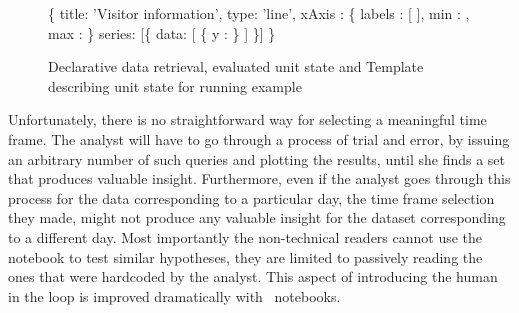 \begin{figure}[hbt!]
\begin{minipage}[c]{6cm}
 \begin{minipage}[c]{7.5cm}
 \begin{code}
    \{
     title: 'Visitor information',
     type: 'line',
     xAxis : \{ 
       labels : [
         ],
       min : ,
       max : 
     \}
     series: [\{
       data: [ 
           \{
             y  : 
           \}  
            ]
     \}] \} 
 \end{code}
 \vspace*{-0.2cm}
 \vspace*{0cm}
 \label{figure:first-running-example:main-template}
 \end{minipage}
 \end{minipage}
 \vspace*{-0.3cm}
 \caption{Declarative data retrieval, evaluated unit state and Template describing unit state for running example}
 \vspace*{-0.3cm}
 \end{figure}
 
  Unfortunately, there is no straightforward way for selecting a meaningful time frame. The analyst will have to go through a process of trial and error, by issuing an arbitrary number of such queries and plotting the results, until she finds a set that produces valuable insight. Furthermore, even if the analyst goes through this process for the data corresponding to a particular day, the time frame selection they made, might not produce any valuable insight for the dataset corresponding to a different day. Most importantly the non-technical readers cannot use the notebook to test similar hypotheses, they are limited to passively reading the ones that were hardcoded by the analyst. This aspect of introducing the human in the loop is improved dramatically with \projname\ notebooks.
 


